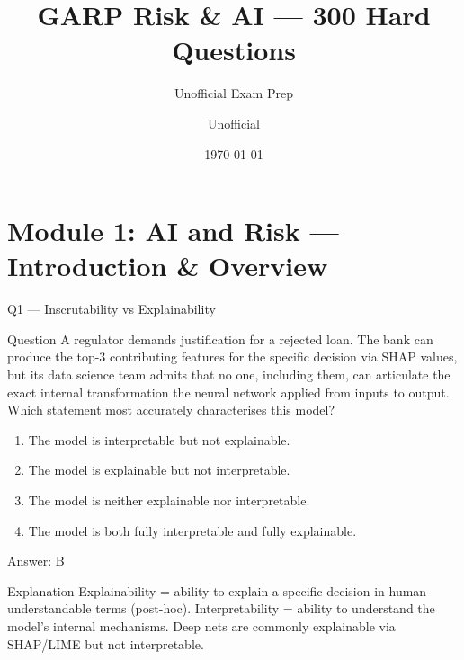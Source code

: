 \documentclass[aspectratio=169,8pt]{beamer}
\title[GARP RAI]{GARP Risk \& AI --- 300 Hard Questions}
\subtitle{Unofficial Exam Prep}
\author{Unofficial}
\date{\today}
\begin{document}
	\begin{frame}\titlepage\end{frame}
	
	\section{Module 1: AI and Risk --- Introduction \& Overview}
	
	\begin{frame}{Q1 --- Inscrutability vs Explainability}
		\begin{block}{Question}
			A regulator demands justification for a rejected loan. The bank can produce the top-3 contributing features for the specific decision via SHAP values, but its data science team admits that no one, including them, can articulate the exact internal transformation the neural network applied from inputs to output. Which statement most accurately characterises this model?
		\end{block}
		\begin{enumerate}
			\item The model is interpretable but not explainable.
			\item The model is explainable but not interpretable.
			\item The model is neither explainable nor interpretable.
			\item The model is both fully interpretable and fully explainable.
		\end{enumerate}
		\begin{exampleblock}{Answer: B}\end{exampleblock}
		\begin{block}{Explanation}
			Explainability = ability to explain a specific decision in human-understandable terms (post-hoc). Interpretability = ability to understand the model's internal mechanisms. Deep nets are commonly explainable via SHAP/LIME but not interpretable.
		\end{block}
	\end{frame}
	
\end{document}
